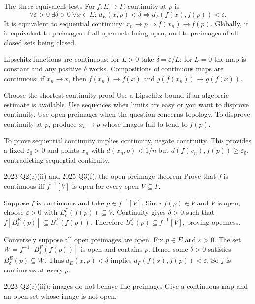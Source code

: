 \begin{note}{The three equivalent tests}
For $f:E\to F$, continuity at $p$ is
\[\forall\varepsilon>0\ \exists\delta>0\ \forall x\in E:\ d_E(x,p)<\delta\Rightarrow d_F(f(x),f(p))<\varepsilon.\]
It is equivalent to sequential continuity: $x_n\to p\Rightarrow f(x_n)\to f(p)$. Globally, it is equivalent to preimages of all open sets being open, and to preimages of all closed sets being closed.

Lipschitz functions are continuous: for $L>0$ take $\delta=\varepsilon/L$; for $L=0$ the map is constant and any positive $\delta$ works. Compositions of continuous maps are continuous: if $x_n\to x$, then $f(x_n)\to f(x)$ and $g(f(x_n))\to g(f(x))$.
\end{note}
\begin{method}{Choose the shortest continuity proof}
Use a Lipschitz bound if an algebraic estimate is available. Use sequences when limits are easy or you want to disprove continuity. Use open preimages when the question concerns topology. To disprove continuity at $p$, produce $x_n\to p$ whose images fail to tend to $f(p)$.

To prove sequential continuity implies continuity, negate continuity. This provides a fixed $\varepsilon_0>0$ and points $x_n$ with $d(x_n,p)<1/n$ but $d(f(x_n),f(p))\ge\varepsilon_0$, contradicting sequential continuity.
\end{method}
\begin{exam}{2023 Q2(c)(ii) and 2025 Q3(f): the open-preimage theorem}
Prove that $f$ is continuous iff $f^{-1}[V]$ is open for every open $V\subseteq F$.
\end{exam}
\begin{answer}
Suppose $f$ is continuous and take $p\in f^{-1}[V]$. Since $f(p)\in V$ and $V$ is open, choose $\varepsilon>0$ with $B_\varepsilon^F(f(p))\subseteq V$. Continuity gives $\delta>0$ such that $f[B_\delta^E(p)]\subseteq B_\varepsilon^F(f(p))$. Therefore $B_\delta^E(p)\subseteq f^{-1}[V]$, proving openness.

Conversely suppose all open preimages are open. Fix $p\in E$ and $\varepsilon>0$. The set $W=f^{-1}[B_\varepsilon^F(f(p))]$ is open and contains $p$. Hence some $\delta>0$ satisfies $B_\delta^E(p)\subseteq W$. Thus $d_E(x,p)<\delta$ implies $d_F(f(x),f(p))<\varepsilon$. So $f$ is continuous at every $p$.
\end{answer}
\begin{exam}{2023 Q2(c)(iii): images do not behave like preimages}
Give a continuous map and an open set whose image is not open.
\end{exam}
